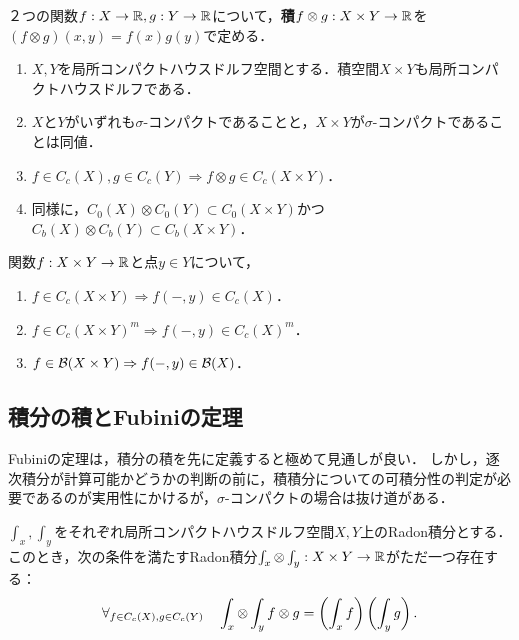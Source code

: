 \documentclass[uplatex,dvipdfmx]{jsreport}
\begin{document}
\begin{definition}[product]
    ２つの関数$f:X\to\mathbb{R},g:Y\to\mathbb{R}$について，\textbf{積}$f\otimes g:X\times Y\to\mathbb{R}$を$(f\otimes g)(x,y)=f(x)g(y)$で定める．
\end{definition}

\begin{lemma}\mbox{}
    \begin{enumerate}
        \item $X,Y$を局所コンパクトハウスドルフ空間とする．積空間$X\times Y$も局所コンパクトハウスドルフである．
        \item $X$と$Y$がいずれも$\sigma$-コンパクトであることと，$X\times Y$が$\sigma$-コンパクトであることは同値．
        \item $f\in C_c(X),g\in C_c(Y)\Rightarrow f\otimes g\in C_c(X\times Y)$．
        \item 同様に，$C_0(X)\otimes C_0(Y)\subset C_0(X\times Y)$かつ$C_b(X)\otimes C_b(Y)\subset C_b(X\times Y)$．
    \end{enumerate}
\end{lemma}

\begin{lemma}
    関数$f:X\times Y\to\mathbb{R}$と点$y\in Y$について，
    \begin{enumerate}
        \item $f\in C_c(X\times Y)\Rightarrow f(-,y)\in C_c(X)$．
        \item $f\in C_c(X\times Y)^m\Rightarrow f(-,y)\in C_c(X)^m$．
        \item $f\in\mathcal{B}(X\times Y)\Rightarrow f(-,y)\in\mathcal{B}(X)$．
    \end{enumerate}
\end{lemma}

\subsection{積分の積とFubiniの定理}

\begin{tcolorbox}[colframe=ForestGreen, colback=ForestGreen!10!white,breakable,colbacktitle=ForestGreen!40!white,coltitle=black,fonttitle=\bfseries\sffamily,
title=]
    Fubiniの定理は，積分の積を先に定義すると極めて見通しが良い．
    しかし，逐次積分が計算可能かどうかの判断の前に，積積分についての可積分性の判定が必要であるのが実用性にかけるが，$\sigma$-コンパクトの場合は抜け道がある．
\end{tcolorbox}

\begin{proposition}
    $\int_x,\int_y$をそれぞれ局所コンパクトハウスドルフ空間$X,Y$上のRadon積分とする．
    このとき，次の条件を満たすRadon積分$\int_x\otimes\int_y:X\times Y\to\mathbb{R}$がただ一つ存在する：
    \[\forall_{f\in C_c(X),g\in C_c(Y)}\quad\int_x\otimes\int_yf\otimes g=\left(\int_xf\right)\left(\int_yg\right).\]
\end{proposition}
\end{document}
